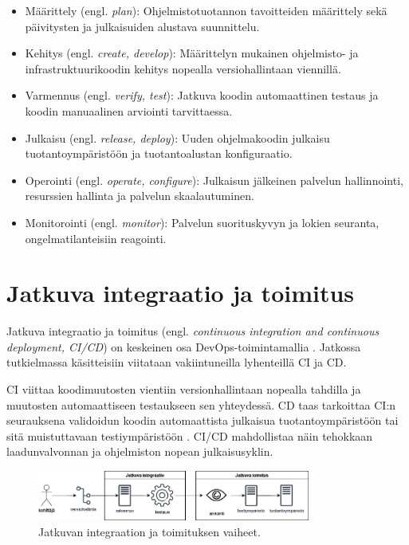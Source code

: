 \begin{itemize}
\item Määrittely (engl. \textit{plan}): Ohjelmistotuotannon tavoitteiden määrittely sekä päivitysten ja julkaisuiden alustava suunnittelu.
\item Kehitys (engl. \textit{create, develop}): Määrittelyn mukainen ohjelmisto- ja infrastruktuurikoodin kehitys nopealla versiohallintaan viennillä.
\item Varmennus (engl. \textit{verify, test}): Jatkuva koodin automaattinen testaus ja koodin manuaalinen arviointi tarvittaessa.
\item Julkaisu (engl. \textit{release, deploy}): Uuden ohjelmakoodin julkaisu tuotantoympäristöön ja tuotantoalustan konfiguraatio.
\item Operointi (engl. \textit{operate, configure}): Julkaisun jälkeinen palvelun hallinnointi, resurssien hallinta ja palvelun skaalautuminen.
\item Monitorointi (engl. \textit{monitor}): Palvelun suorituskyvyn ja lokien seuranta, ongelmatilanteisiin reagointi.
\end{itemize}

\section{Jatkuva integraatio ja toimitus}

Jatkuva integraatio ja toimitus (engl. \textit{continuous integration and continuous deployment, CI/CD}) on keskeinen osa DevOps-toimintamallia \cite{Jabbari16, Leite19}. Jatkossa tutkielmassa käsitteisiin viitataan vakiintuneilla lyhenteillä CI ja CD.

CI viittaa koodimuutosten vientiin versionhallintaan nopealla tahdilla ja muutosten automaattiseen testaukseen sen yhteydessä.
CD taas tarkoittaa CI:n seurauksena validoidun koodin automaattista julkaisua tuotantoympäristöön tai sitä muistuttavaan testiympäristöön \cite{Shahin17}.
CI/CD mahdollistaa näin tehokkaan laadunvalvonnan ja ohjelmiston nopean julkaisusyklin.

\begin{figure}[ht]
\begin{center}
\includegraphics[width=0.8\textwidth]{figures/cicd-pipeline.png}
\caption{Jatkuvan integraation ja toimituksen vaiheet.\label{fig:cicd}}
\end{center}
\end{figure}

